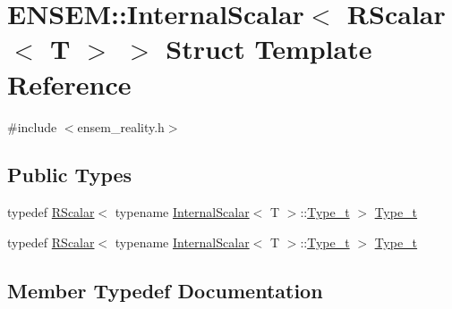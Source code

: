 \hypertarget{structENSEM_1_1InternalScalar_3_01RScalar_3_01T_01_4_01_4}{}\section{E\+N\+S\+EM\+:\+:Internal\+Scalar$<$ R\+Scalar$<$ T $>$ $>$ Struct Template Reference}
\label{structENSEM_1_1InternalScalar_3_01RScalar_3_01T_01_4_01_4}


{\ttfamily \#include $<$ensem\+\_\+reality.\+h$>$}

\subsection*{Public Types}
\begin{DoxyCompactItemize}
\item 
typedef \mbox{\hyperlink{classENSEM_1_1RScalar}{R\+Scalar}}$<$ typename \mbox{\hyperlink{structENSEM_1_1InternalScalar}{Internal\+Scalar}}$<$ T $>$\+::\mbox{\hyperlink{structENSEM_1_1InternalScalar_3_01RScalar_3_01T_01_4_01_4_a2acb8111a19ee425e0751d1355d5151e}{Type\+\_\+t}} $>$ \mbox{\hyperlink{structENSEM_1_1InternalScalar_3_01RScalar_3_01T_01_4_01_4_a2acb8111a19ee425e0751d1355d5151e}{Type\+\_\+t}}
\item 
typedef \mbox{\hyperlink{classENSEM_1_1RScalar}{R\+Scalar}}$<$ typename \mbox{\hyperlink{structENSEM_1_1InternalScalar}{Internal\+Scalar}}$<$ T $>$\+::\mbox{\hyperlink{structENSEM_1_1InternalScalar_3_01RScalar_3_01T_01_4_01_4_a2acb8111a19ee425e0751d1355d5151e}{Type\+\_\+t}} $>$ \mbox{\hyperlink{structENSEM_1_1InternalScalar_3_01RScalar_3_01T_01_4_01_4_a2acb8111a19ee425e0751d1355d5151e}{Type\+\_\+t}}
\end{DoxyCompactItemize}


\subsection{Member Typedef Documentation}
\mbox{\label{structENSEM_1_1InternalScalar_3_01RScalar_3_01T_01_4_01_4_a2acb8111a19ee425e0751d1355d5151e}} 
